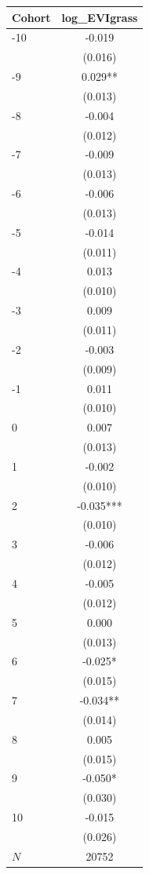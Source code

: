 {
\def\sym#1{\ifmmode^{#1}\else\(^{#1}\)\fi}
\begin{tabular}{l*{1}{c}}
\toprule
Cohort    &log\_EVIgrass   \\
\midrule
-10       &   -0.019   \\
          &  (0.016)   \\
-9        &    0.029** \\
          &  (0.013)   \\
-8        &   -0.004   \\
          &  (0.012)   \\
-7        &   -0.009   \\
          &  (0.013)   \\
-6        &   -0.006   \\
          &  (0.013)   \\
-5        &   -0.014   \\
          &  (0.011)   \\
-4        &    0.013   \\
          &  (0.010)   \\
-3        &    0.009   \\
          &  (0.011)   \\
-2        &   -0.003   \\
          &  (0.009)   \\
-1        &    0.011   \\
          &  (0.010)   \\
0         &    0.007   \\
          &  (0.013)   \\
1         &   -0.002   \\
          &  (0.010)   \\
2         &   -0.035***\\
          &  (0.010)   \\
3         &   -0.006   \\
          &  (0.012)   \\
4         &   -0.005   \\
          &  (0.012)   \\
5         &    0.000   \\
          &  (0.013)   \\
6         &   -0.025*  \\
          &  (0.015)   \\
7         &   -0.034** \\
          &  (0.014)   \\
8         &    0.005   \\
          &  (0.015)   \\
9         &   -0.050*  \\
          &  (0.030)   \\
10        &   -0.015   \\
          &  (0.026)   \\
\midrule
\(N\)     &    20752   \\
\bottomrule
\end{tabular}
}
